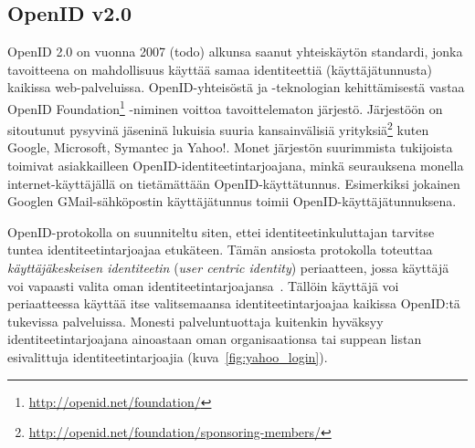 \documentclass[finnish,gradu]{tktltiki}
\begin{document}




  \subsection{OpenID v2.0} %
  \label{sub:openid}


  OpenID 2.0 on vuonna 2007 (todo) alkunsa saanut yhteiskäytön standardi, jonka tavoitteena on mahdollisuus käyttää samaa identiteettiä (käyttäjätunnusta) kaikissa web-palveluissa. OpenID-yhteisöstä ja -teknologian kehittämisestä vastaa OpenID Foundation\footnote{\url{http://openid.net/foundation/}} -niminen voittoa tavoittelematon järjestö. Järjestöön on sitoutunut pysyvinä jäseninä lukuisia suuria kansainvälisiä yrityksiä\footnote{\url{http://openid.net/foundation/sponsoring-members/}} kuten Google, Microsoft, Symantec ja Yahoo!. Monet järjestön suurimmista tukijoista toimivat asiakkailleen OpenID-identiteetintarjoajana, minkä seurauksena monella internet-käyttäjällä on tietämättään OpenID-käyttätunnus. Esimerkiksi jokainen Googlen GMail-sähköpostin käyttäjätunnus toimii  OpenID-käyttäjätunnuksena.

  OpenID-protokolla on suunniteltu siten, ettei identiteetinkuluttajan tarvitse tuntea identiteetintarjoajaa etukäteen. Tämän ansiosta protokolla toteuttaa \emph{käyttäjäkeskeisen identiteetin} (\emph{user centric identity}) periaatteen, jossa käyttäjä voi vapaasti valita oman identiteetintarjoajansa~\cite{openid_recordon_2009}. Tällöin käyttäjä voi periaatteessa käyttää itse valitsemaansa identiteetintarjoajaa kaikissa OpenID:tä tukevissa palveluissa.
  Monesti palveluntuottaja kuitenkin hyväksyy identiteetintarjoajana ainoastaan oman organisaationsa tai suppean listan esivalittuja identiteetintarjoajia (kuva~\ref{fig:yahoo_login}).
\end{document}
